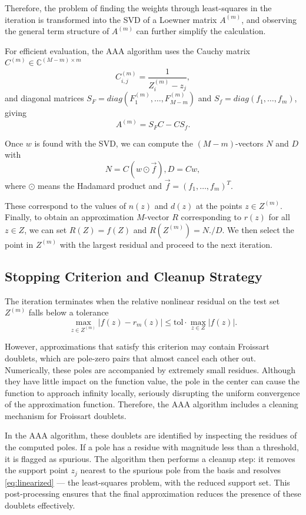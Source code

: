 \documentclass[12pt,a4paper]{article}  %
\theoremstyle{definition}
\numberwithin{equation}{section}
\begin{document}
Therefore, the problem of finding the weights through least-squares in the iteration is transformed into the SVD of a Loewner matrix $A^{(m)}$, and observing the general term structure of $A^{(m)}$ can further simplify the calculation.

For efficient evaluation, the AAA algorithm uses the Cauchy matrix $C^{(m)}\in\mathbb{C}^{(M-m)\times m}$ 
\[
C_{i,j}^{(m)}=\frac{1}{Z_i^{(m)}-z_j},
\]
and diagonal matrices $S_F=diag(F_1^{(m)},\dots,F_{M-m}^{(m)})$ and $S_f=diag(f_1,\dots,f_m)$, giving
\begin{equation}
    A^{(m)}=S_FC-CS_f.  \label{eq:decompose of A}
\end{equation}

Once $w$ is found with the SVD, we can compute the $(M-m)$-vectors $N$ and $D$ with
\begin{equation}
    N=C(w\odot \vec{f}), D=Cw,   \label{eq:N,D}
\end{equation}
where $\odot$ means the Hadamard product and $\vec{f}=(f_1,\dots,f_m)^T$.

These correspond to the values of $n(z)$ and $d(z)$ at the points $z\in Z^{(m)}$. Finally, to obtain an approximation $M$-vector $R$ corresponding to $r(z)$ for all $z\in Z$, we can set $R(Z)=f(Z)$ and $R(Z^{(m)})=N./D$. We then select the point in $Z^{(m)}$ with the largest residual and proceed to the next iteration.

\subsection{Stopping Criterion and Cleanup Strategy}
The iteration terminates when the relative nonlinear residual on the test set $Z^{(m)}$ falls below a tolerance
\begin{equation}
    \max_{z\in Z^{(m)}}|f(z)-r_m(z)|\le \text{tol}\cdot \max_{z\in Z}|f(z)|. \label{eq:Stopping}
\end{equation}

However, approximations that satisfy this criterion may contain Froissart doublets, which are pole-zero pairs that almost cancel each other out. Numerically, these poles are accompanied by extremely small residues. Although they have little impact on the function value, the pole in the center can cause the function to approach infinity locally, seriously disrupting the uniform convergence of the approximation function. Therefore, the AAA algorithm includes a cleaning mechanism for Froissart doublets.

In the AAA algorithm, these doublets are identified by inspecting the residues of the computed poles. If a pole has a residue with magnitude less than a threshold, it is flagged as spurious. The algorithm then performs a cleanup step: it removes the support point $z_j$ nearest to the spurious pole from the basis and resolves \ref{eq:linearized} --- 
the least-squares problem, with the reduced support set. This post-processing ensures that the final approximation reduces the presence of these doublets effectively.
\end{document}
